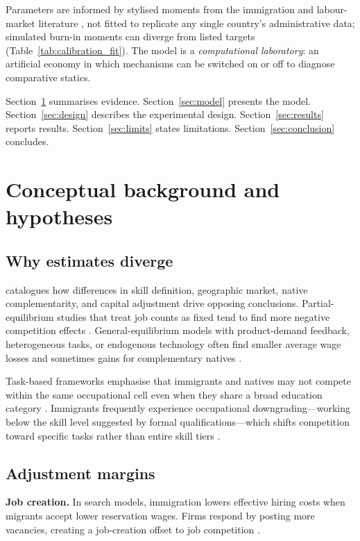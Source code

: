 \documentclass[11pt,a4paper]{article}
\begin{document}
Parameters are informed by stylised moments from the immigration and labour-market literature \citep{borjas2016,dustmann2013,peri2016}, not fitted to replicate any single country's administrative data; simulated burn-in moments can diverge from listed targets (Table~\ref{tab:calibration_fit}).
The model is a \emph{computational laboratory}: an artificial economy in which mechanisms can be switched on or off to diagnose comparative statics.

Section~\ref{sec:background} summarises evidence.
Section~\ref{sec:model} presents the model.
Section~\ref{sec:design} describes the experimental design.
Section~\ref{sec:results} reports results.
Section~\ref{sec:limits} states limitations.
Section~\ref{sec:conclusion} concludes.

\section{Conceptual background and hypotheses}
\label{sec:background}

\subsection{Why estimates diverge}

\citet{borjas2016} catalogues how differences in skill definition, geographic market, native complementarity, and capital adjustment drive opposing conclusions.
Partial-equilibrium studies that treat job counts as fixed tend to find more negative competition effects \citep{borjas2003}.
General-equilibrium models with product-demand feedback, heterogeneous tasks, or endogenous technology often find smaller average wage losses and sometimes gains for complementary natives \citep{peri2016,peri2009,ottaviano2012}.

Task-based frameworks emphasise that immigrants and natives may not compete within the same occupational cell even when they share a broad education category \citep{peri2009}.
Immigrants frequently experience occupational downgrading---working below the skill level suggested by formal qualifications---which shifts competition toward specific tasks rather than entire skill tiers \citep{dustmann2013,borjas2016}.

\subsection{Adjustment margins}

\textbf{Job creation.}
In search models, immigration lowers effective hiring costs when migrants accept lower reservation wages.
Firms respond by posting more vacancies, creating a job-creation offset to job competition \citep{albert2021}.
\end{document}
